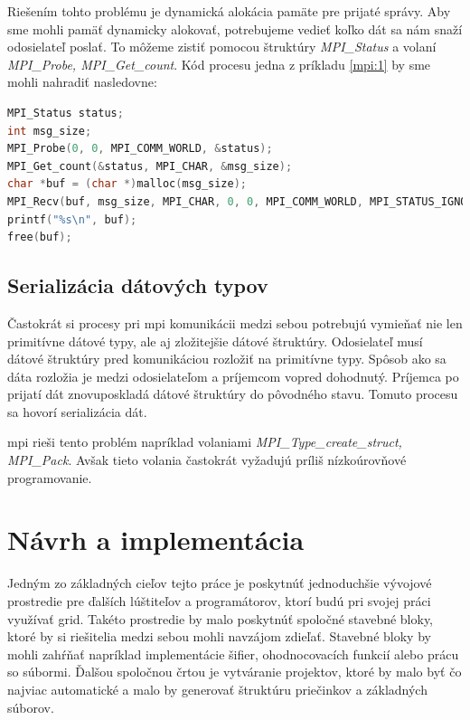 Riešením tohto problému je dynamická alokácia pamäte pre prijaté správy. Aby sme mohli pamäť dynamicky alokovať, potrebujeme vedieť
koľko dát sa nám snaží odosielateľ poslať. To môžeme zistiť pomocou štruktúry \textit{MPI\_Status} a volaní \textit{MPI\_Probe, MPI\_Get\_count}.
Kód procesu jedna z príkladu \ref{mpi:1} by sme mohli nahradiť nasledovne:
\begin{lstlisting}[language=c]
MPI_Status status;
int msg_size;
MPI_Probe(0, 0, MPI_COMM_WORLD, &status);
MPI_Get_count(&status, MPI_CHAR, &msg_size);
char *buf = (char *)malloc(msg_size);
MPI_Recv(buf, msg_size, MPI_CHAR, 0, 0, MPI_COMM_WORLD, MPI_STATUS_IGNORE);
printf("%s\n", buf);
free(buf);
\end{lstlisting}

\subsection{Serializácia dátových typov}
\label{kap:serialize}
Častokrát si procesy pri \acrshort{mpi} komunikácii medzi sebou potrebujú vymieňať nie len primitívne dátové typy, ale aj zložitejšie dátové štruktúry.
Odosielateľ musí dátové štruktúry pred komunikáciou rozložiť na primitívne typy. Spôsob ako sa dáta rozložia je medzi odosielateľom a príjemcom vopred dohodnutý.
Príjemca po prijatí dát znovuposkladá dátové štruktúry do pôvodného stavu. Tomuto procesu sa hovorí serializácia dát.

\acrshort{mpi} rieši tento problém napríklad volaniami \textit{MPI\_Type\_create\_struct, MPI\_Pack}.
Avšak tieto volania častokrát vyžadujú príliš nízkoúrovňové programovanie.


\section{Návrh a implementácia}
Jedným zo základných cieľov tejto práce je poskytnúť jednoduchšie vývojové prostredie pre ďalších lúštiteľov a programátorov,
ktorí budú pri svojej práci využívať grid.
Takéto prostredie by malo poskytnúť spoločné stavebné bloky, ktoré by si riešitelia medzi sebou mohli navzájom zdieľať.
Stavebné bloky by mohli zahŕňať napríklad implementácie šifier, ohodnocovacích funkcií alebo prácu so súbormi.
Ďalšou spoločnou črtou je vytváranie projektov, ktoré by malo byť čo najviac automatické a malo by generovať štruktúru priečinkov a základných súborov.

